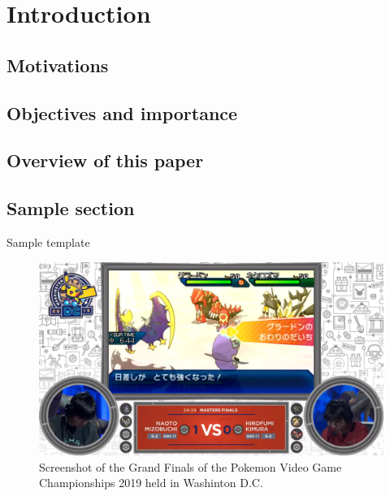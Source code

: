 \chapter{Introduction}

\section{Motivations}

\section{Objectives and importance}

\section{Overview of this paper}

\section{Sample section}

Sample template \cite{alphago}

\begin{figure}
  \centering
  \includegraphics[width=\columnwidth]{resources/1_intro/vgc2019.png}
    \caption{Screenshot of the Grand Finals of the Pokemon Video Game Championships 2019 held in Washinton D.C.}
\end{figure}

